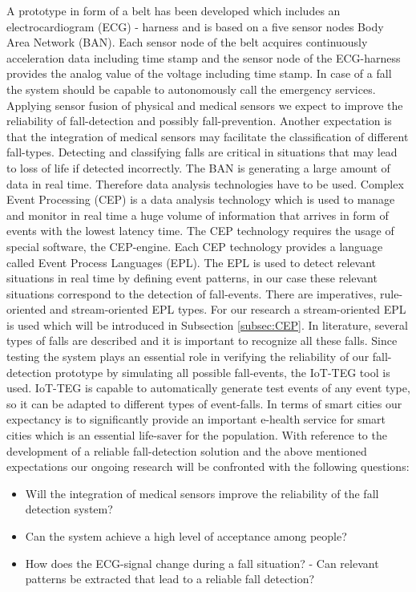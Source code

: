 \documentclass[review]{elsarticle}
\begin{document}
A prototype in form of a belt has been developed which includes an electrocardiogram (ECG) - harness and is based on a five sensor nodes Body Area Network (BAN). Each sensor node of the belt acquires continuously acceleration data including time stamp and the sensor node of the ECG-harness provides the analog value of the voltage including time stamp. In case of a fall the system should be capable to autonomously call the emergency services. Applying sensor fusion of physical and medical sensors we expect to improve the reliability of fall-detection and possibly fall-prevention. Another expectation is that the integration of medical sensors may facilitate the classification of different fall-types. Detecting and classifying falls are critical in situations that may lead to loss of life if detected incorrectly. The BAN is generating a large amount of data in real time. Therefore data analysis technologies have to be used. Complex Event Processing (CEP) \cite{Esper:2016} is a data analysis technology which is used to manage and monitor in real time a huge volume of information that arrives in form of events with the lowest latency time. The CEP technology requires the usage of special software, the CEP-engine. Each CEP technology provides a language called Event Process Languages (EPL). The EPL is used to detect relevant situations in real time by defining event patterns, in our case these relevant situations correspond to the detection of fall-events. There are imperatives, rule-oriented and stream-oriented EPL types. For our research a stream-oriented EPL is used which will be introduced in Subsection \ref{subsec:CEP}.  In literature, several types of falls are described and it is important to recognize all these falls. Since testing the system plays an essential role in verifying the reliability of our fall-detection prototype by simulating all possible fall-events, the IoT-TEG tool \cite{Gutierrez2017,TesisGutierrez2017} is used. IoT-TEG \cite{Gutierrez2017,TesisGutierrez2017} is capable to automatically generate test events of any event type, so it can be adapted to different types of event-falls.
In terms of smart cities our expectancy is to significantly provide an important e-health service for smart cities which is an essential life-saver for the population. With reference to the development of a reliable fall-detection solution and the above mentioned expectations our ongoing research will be confronted with the following questions:
\begin{itemize}
	\item Will the integration of medical sensors improve the reliability of the fall detection system?
	\item Can the system achieve a high level of acceptance among people?
	\item How does the ECG-signal change during a fall situation? - Can relevant patterns be extracted that lead to a reliable fall detection?
	
\end{itemize}
\end{document}
